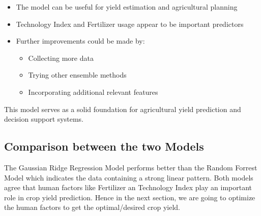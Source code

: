 \begin{itemize}
    \item The model can be useful for yield estimation and agricultural planning
    \item Technology Index and Fertilizer usage appear to be important predictors
    \item Further improvements could be made by:
    \begin{itemize}
        \item Collecting more data
        \item Trying other ensemble methods
        \item Incorporating additional relevant features
    \end{itemize}
\end{itemize}

This model serves as a solid foundation for agricultural yield prediction and decision support systems.

\subsection{Comparison between the two Models}

The Gaussian Ridge Regression Model performs better than the Random Forrest Model which indicates the data containing a strong linear pattern. Both models agree that human factors like Fertilizer an Technology Index play an important role in crop yield prediction. Hence in the next section, we are going to optimize the human factors to get the optimal/desired crop yield.


